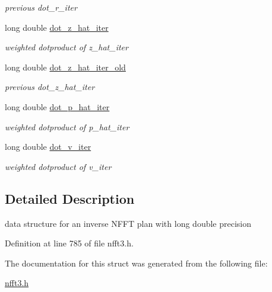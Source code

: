\begin{DoxyCompactItemize}
\begin{DoxyCompactList}\small\item\em previous dot\-\_\-r\-\_\-iter \end{DoxyCompactList}\item 
\hypertarget{structsolverl__plan__double_aefacac40db7773101ce75ba8247119b7}{long double \hyperlink{structsolverl__plan__double_aefacac40db7773101ce75ba8247119b7}{dot\-\_\-z\-\_\-hat\-\_\-iter}}\label{structsolverl__plan__double_aefacac40db7773101ce75ba8247119b7}

\begin{DoxyCompactList}\small\item\em weighted dotproduct of z\-\_\-hat\-\_\-iter \end{DoxyCompactList}\item 
\hypertarget{structsolverl__plan__double_aa991891a7df826b77fac977581f9077c}{long double \hyperlink{structsolverl__plan__double_aa991891a7df826b77fac977581f9077c}{dot\-\_\-z\-\_\-hat\-\_\-iter\-\_\-old}}\label{structsolverl__plan__double_aa991891a7df826b77fac977581f9077c}

\begin{DoxyCompactList}\small\item\em previous dot\-\_\-z\-\_\-hat\-\_\-iter \end{DoxyCompactList}\item 
\hypertarget{structsolverl__plan__double_a2f43c87a598dff5b6e87960a07864148}{long double \hyperlink{structsolverl__plan__double_a2f43c87a598dff5b6e87960a07864148}{dot\-\_\-p\-\_\-hat\-\_\-iter}}\label{structsolverl__plan__double_a2f43c87a598dff5b6e87960a07864148}

\begin{DoxyCompactList}\small\item\em weighted dotproduct of p\-\_\-hat\-\_\-iter \end{DoxyCompactList}\item 
\hypertarget{structsolverl__plan__double_a849c4c1c131a333885e581fec5a2dac0}{long double \hyperlink{structsolverl__plan__double_a849c4c1c131a333885e581fec5a2dac0}{dot\-\_\-v\-\_\-iter}}\label{structsolverl__plan__double_a849c4c1c131a333885e581fec5a2dac0}

\begin{DoxyCompactList}\small\item\em weighted dotproduct of v\-\_\-iter \end{DoxyCompactList}\end{DoxyCompactItemize}


\subsection{Detailed Description}
data structure for an inverse N\-F\-F\-T plan with long double precision 

Definition at line 785 of file nfft3.\-h.



The documentation for this struct was generated from the following file\-:\begin{DoxyCompactItemize}
\item 
\hyperlink{nfft3_8h}{nfft3.\-h}\end{DoxyCompactItemize}
